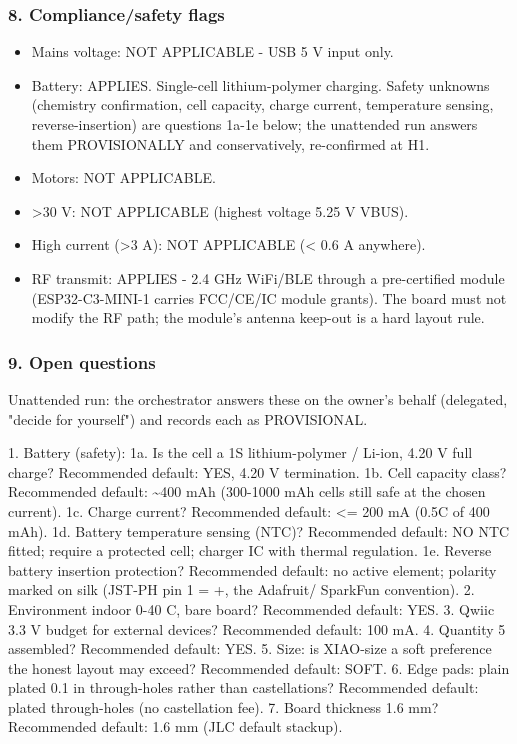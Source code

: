 \documentclass[11pt]{article}
\begin{document}
\subsubsection*{8. Compliance/safety flags}
\begin{itemize}
\item Mains voltage: NOT APPLICABLE - USB 5 V input only.
\item Battery: APPLIES. Single-cell lithium-polymer charging. Safety unknowns
(chemistry confirmation, cell capacity, charge current, temperature sensing,
reverse-insertion) are questions 1a-1e below; the unattended run answers them
PROVISIONALLY and conservatively, re-confirmed at H1.
\item Motors: NOT APPLICABLE.
\item \textgreater{}30 V: NOT APPLICABLE (highest voltage 5.25 V VBUS).
\item High current (\textgreater{}3 A): NOT APPLICABLE (\textless{} 0.6 A anywhere).
\item RF transmit: APPLIES - 2.4 GHz WiFi/BLE through a pre-certified module
(ESP32-C3-MINI-1 carries FCC/CE/IC module grants). The board must not
modify the RF path; the module's antenna keep-out is a hard layout rule.
\end{itemize}
\subsubsection*{9. Open questions}
Unattended run: the orchestrator answers these on the owner's behalf (delegated, "decide for yourself") and records each as PROVISIONAL.

1. Battery (safety): 1a. Is the cell a 1S lithium-polymer / Li-ion, 4.20 V full charge? Recommended default: YES, 4.20 V termination. 1b. Cell capacity class? Recommended default: \textasciitilde{}400 mAh (300-1000 mAh cells still safe at the chosen current). 1c. Charge current? Recommended default: \textless{}= 200 mA (0.5C of 400 mAh). 1d. Battery temperature sensing (NTC)? Recommended default: NO NTC fitted; require a protected cell; charger IC with thermal regulation. 1e. Reverse battery insertion protection? Recommended default: no active element; polarity marked on silk (JST-PH pin 1 = +, the Adafruit/ SparkFun convention). 2. Environment indoor 0-40 C, bare board? Recommended default: YES. 3. Qwiic 3.3 V budget for external devices? Recommended default: 100 mA. 4. Quantity 5 assembled? Recommended default: YES. 5. Size: is XIAO-size a soft preference the honest layout may exceed? Recommended default: SOFT. 6. Edge pads: plain plated 0.1 in through-holes rather than castellations? Recommended default: plated through-holes (no castellation fee). 7. Board thickness 1.6 mm? Recommended default: 1.6 mm (JLC default stackup).
\end{document}
